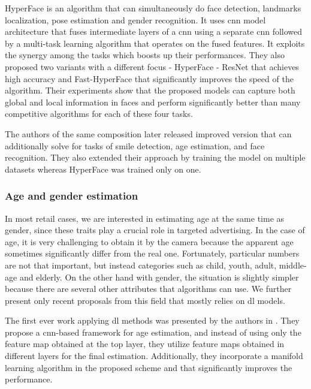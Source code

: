             HyperFace \cite{ranjan2019hyperface} is an algorithm that can simultaneously do face detection, landmarks localization, pose estimation and gender recognition. It uses \gls{cnn} model architecture that fuses intermediate layers of a \gls{cnn} using a separate \gls{cnn} followed by a multi-task learning algorithm that operates on the fused features. It exploits the synergy among the tasks which boosts up their performances. They also proposed two variants with a different focus - HyperFace - ResNet that achieves high accuracy and Fast-HyperFace that significantly improves the speed of the algorithm. Their experiments show that the proposed models can capture both global and local information in faces and perform significantly better than many competitive algorithms for each of these four tasks.
            
            The authors of the same composition later released improved version \cite{ranjan2017all} that can additionally solve for tasks of smile detection, age estimation, and face recognition. They also extended their approach by training the model on multiple datasets whereas HyperFace was trained only on one. 

        \subsubsection{Age and gender estimation}\label{age_and_gender_estimation_related}
            In most retail cases, we are interested in estimating age at the same time as gender, since these traits play a crucial role in targeted advertising. In the case of age, it is very challenging to obtain it by the camera because the apparent age sometimes significantly differ from the real one. Fortunately, particular numbers are not that important, but instead categories such as child, youth, adult, middle-age and elderly. On the other hand with gender, the situation is slightly simpler because there are several other attributes that algorithms can use. We further present only recent proposals from this field that mostly relies on \gls{dl} models. 
            
            The first ever work applying \gls{dl} methods was presented by the authors in \cite{wang2015deeply}. They propose a \gls{cnn}-based framework for age estimation, and instead of using only the feature map obtained at the top layer, they utilize feature maps obtained in different layers for the final estimation. Additionally, they incorporate a manifold learning algorithm in the proposed scheme and that significantly improves the performance.

